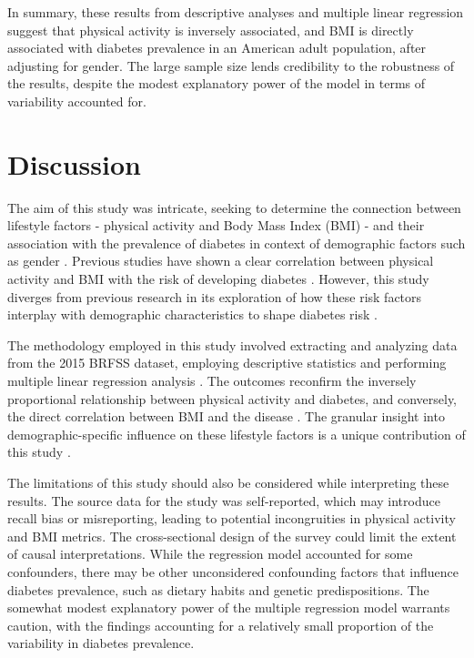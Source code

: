 \documentclass[11pt]{article}
\begin{document}
In summary, these results from descriptive analyses and multiple linear regression suggest that physical activity is inversely associated, and BMI is directly associated with diabetes prevalence in an American adult population, after adjusting for gender. The large sample size lends credibility to the robustness of the results, despite the modest explanatory power of the model in terms of variability accounted for.

\section*{Discussion}

The aim of this study was intricate, seeking to determine the connection between lifestyle factors - physical activity and Body Mass Index (BMI) - and their association with the prevalence of diabetes in context of demographic factors such as gender \cite{Khanam2019PrevalenceAR, Seiglie2020DiabetesPA, Hjerkind2017AdiposityPA}. Previous studies have shown a clear correlation between physical activity and BMI with the risk of developing diabetes \cite{Boffetta2011BodyMI, Bohn2015ImpactOP}. However, this study diverges from previous research in its exploration of how these risk factors interplay with demographic characteristics to shape diabetes risk \cite{Hjerkind2017AdiposityPA, Boffetta2011BodyMI, Seiglie2020DiabetesPA}.

The methodology employed in this study involved extracting and analyzing data from the 2015 BRFSS dataset, employing descriptive statistics and performing multiple linear regression analysis \cite{Aune2015PhysicalAA, Li2015ParsimoniousTR}. The outcomes reconfirm the inversely proportional relationship between physical activity and diabetes, and conversely, the direct correlation between BMI and the disease \cite{Hjerkind2017AdiposityPA, Bohn2015ImpactOP}. The granular insight into demographic-specific influence on these lifestyle factors is a unique contribution of this study \cite{Pham2019EthnicDI, Gustavsson2014FTOGP}.

The limitations of this study should also be considered while interpreting these results. The source data for the study was self-reported, which may introduce recall bias or misreporting, leading to potential incongruities in physical activity and BMI metrics. The cross-sectional design of the survey could limit the extent of causal interpretations. While the regression model accounted for some confounders, there may be other unconsidered confounding factors that influence diabetes prevalence, such as dietary habits and genetic predispositions. The somewhat modest explanatory power of the multiple regression model warrants caution, with the findings accounting for a relatively small proportion of the variability in diabetes prevalence.
\end{document}
